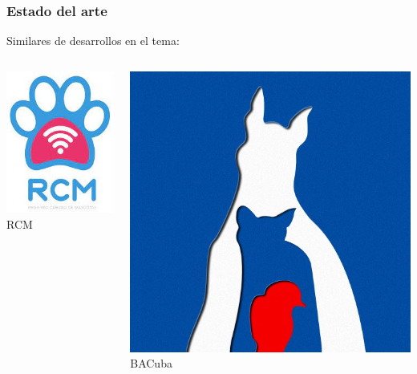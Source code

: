 \documentclass[14pt]{beamer}
\begin{document}
\begin{frame}
\frametitle{Estado del arte}
Similares de desarrollos en el tema:


\begin{columns}
\begin{column}{0.3\textwidth}
\begin{center}

\includegraphics[scale =0.3]{Images/RCM.jpg}\\
\caption{RCM}\
\end{center}
\end{column}
\begin{column}{0.3\textwidth}
\begin{center}

\includegraphics[scale =0.12]{Images/BAC.jpg}\\
\caption{BACuba}
\end{center}
\end{column}


\end{columns}
\end{frame}
\end{document}

